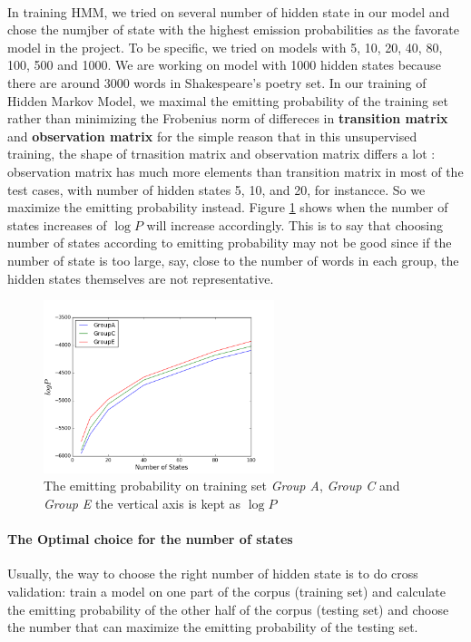 %
\paragraph{}
In training HMM, we tried on several number of hidden state in our model and chose the numjber of state with the highest emission probabilities as the favorate model in the project. To be specific, we tried on models with 5, 10, 20, 40, 80, 100, 500 and 1000. We are working on model with 1000 hidden states because there are around 3000 words in Shakespeare's poetry set. In our training of Hidden Markov Model,  we maximal the emitting probability of the training set rather than minimizing the Frobenius norm of differeces in \textbf{transition matrix} and \textbf{observation matrix} for the simple reason that in this unsupervised training, the shape of trnasition matrix and observation matrix differs a lot : observation matrix has much more elements than transition matrix in most of the test cases, with number of hidden states 5, 10, and 20, for
instancce. So we maximize the emitting probability instead. Figure \ref{fig:probability} shows when the number of states increases of $\log P$ will increase accordingly. This is to say that choosing number of states according to emitting probability may not be good since if the number of state is too large, say, close to the number of words in each group, the hidden states themselves are not representative.
 \begin{figure}[h!]
 \centering
 \includegraphics[width=0.6\textwidth]{./figure/probability.png}
 \caption{The emitting probability on training set \textit{Group A}, \textit{Group C} and \textit{Group E} the vertical axis is kept as $\log P$\label{fig:probability}}
 \end{figure}
\paragraph{The Optimal choice for the number of states} Usually, the way to choose the right number of hidden state is to do cross validation: train a model on one part of the corpus (training set) and calculate the emitting probability of the other half of the corpus (testing set) and choose the number that can maximize the emitting probability of the testing set.

